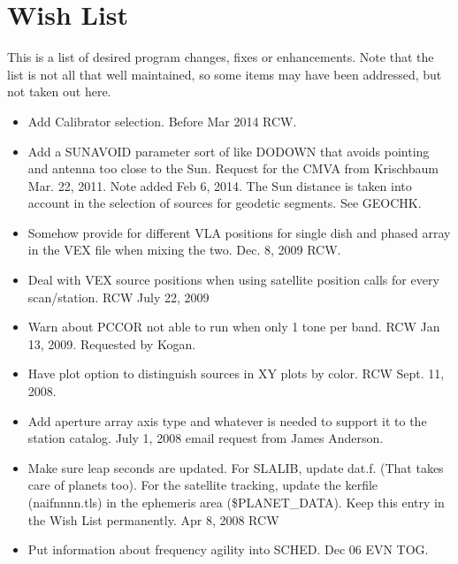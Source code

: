 \documentclass{report}
\begin{document}
\section{\label{SSEC:BUGS}Wish List}

This is a list of desired program changes, fixes or enhancements.  Note
that the list is not all that well maintained, so some items may have
been addressed, but not taken out here.


\begin{itemize}

\item Add Calibrator selection.  Before Mar 2014  RCW.

\item Add a SUNAVOID parameter sort of like DODOWN that avoids pointing
      and antenna too close to the Sun.  Request for the CMVA from
      Krischbaum  Mar. 22, 2011.  Note added Feb 6, 2014.  The Sun
      distance is taken into account in the selection of sources for
      geodetic segments.  See GEOCHK.

\item Somehow provide for different VLA positions for single dish
      and phased array in the VEX file when mixing the two.  Dec. 8,
      2009 RCW.

\item Deal with VEX source positions when using satellite position
      calls for every scan/station.     RCW July 22, 2009

\item Warn about PCCOR not able to run when only 1 tone per band.  RCW
      Jan 13, 2009.  Requested by Kogan.

\item Have plot option to distinguish sources in XY plots by color.
      RCW  Sept. 11, 2008.

\item Add aperture array axis type and whatever is needed to support it
      to the station catalog.  July 1, 2008 email request from
      James Anderson.

\item Make sure leap seconds are updated.
      For SLALIB, update dat.f.  (That takes care of planets too).
      For the satellite tracking, update the kerfile (naifnnnn.tls) in the
         ephemeris area (\$PLANET\_DATA).
      Keep this entry in the Wish List permanently.  Apr 8, 2008 RCW

\item Put information about frequency agility into SCHED. Dec 06 EVN TOG.


\end{itemize}
\end{document}
